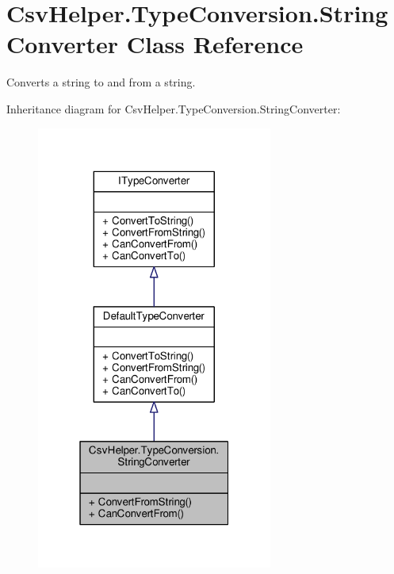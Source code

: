 \hypertarget{a00143}{\section{Csv\-Helper.\-Type\-Conversion.\-String\-Converter Class Reference}
\label{a00143}
}


Converts a string to and from a string.  




Inheritance diagram for Csv\-Helper.\-Type\-Conversion.\-String\-Converter\-:
\nopagebreak
\begin{figure}[H]
\begin{center}
\leavevmode
\includegraphics[width=220pt]{d5/d0f/a00494}
\end{center}
\end{figure}


